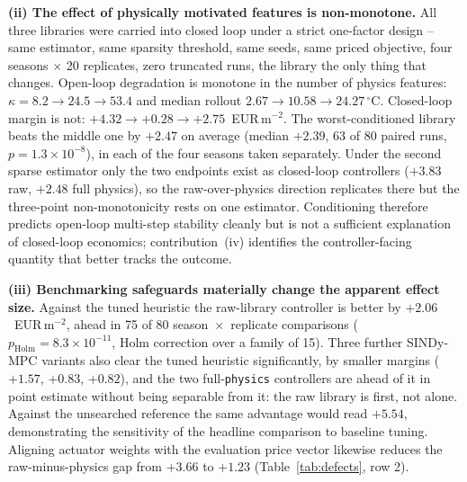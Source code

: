\textbf{(ii) The effect of physically motivated features is non-monotone.} All three
libraries were carried into closed loop under a
strict one-factor design -- same estimator, same sparsity threshold, same seeds, same
priced objective, four seasons $\times$ 20 replicates, zero truncated runs, the library
the only thing that changes. Open-loop degradation is monotone in the number of physics
features: $\kappa = 8.2 \rightarrow 24.5 \rightarrow 53.4$ and median rollout
$2.67 \rightarrow 10.58 \rightarrow 24.27\,^\circ$C. Closed-loop margin is not:
$+4.32 \rightarrow +0.28 \rightarrow +2.75$~EUR\,m$^{-2}$. The worst-conditioned library
beats the middle one by $+2.47$ on average (median $+2.39$, 63 of 80 paired runs,
$p = 1.3\times10^{-8}$), in each of the four seasons taken separately. Under the second
sparse estimator only the two endpoints exist as closed-loop controllers ($+3.83$ raw,
$+2.48$ full physics), so the raw-over-physics direction replicates there but the
three-point non-monotonicity rests on one estimator. Conditioning therefore predicts
open-loop multi-step stability cleanly but is not a sufficient explanation of closed-loop
economics; contribution~(iv) identifies the controller-facing quantity that better tracks
the outcome.

\textbf{(iii) Benchmarking safeguards materially change the apparent effect size.}
Against the tuned heuristic the raw-library controller is better by
$+2.06$~EUR\,m$^{-2}$, ahead in 75 of 80 season~$\times$~replicate comparisons
($p_{\mathrm{Holm}} = 8.3 \times 10^{-11}$, Holm correction over a family of 15). Three
further SINDy-MPC variants also clear
the tuned heuristic significantly, by smaller margins ($+1.57$, $+0.83$, $+0.82$), and the
two full-\texttt{physics} controllers are ahead of it in point estimate without being
separable from it: the raw library is first, not alone. Against the unsearched reference
the same advantage would read $+5.54$, demonstrating the sensitivity of the headline
comparison to baseline tuning. Aligning actuator weights with the evaluation price vector
likewise reduces the raw-minus-physics gap from $+3.66$ to $+1.23$
(Table~\ref{tab:defects}, row 2).

